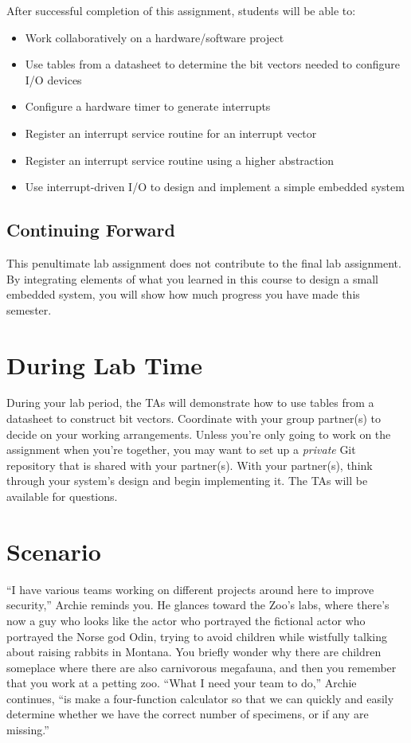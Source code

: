 After successful completion of this assignment, students will be able to:
\begin{itemize}
\item Work collaboratively on a hardware/software project
\item Use tables from a datasheet to determine the bit vectors needed to
    configure I/O devices
\item Configure a hardware timer to generate interrupts
\item Register an interrupt service routine for an interrupt vector
\item Register an interrupt service routine using a higher abstraction
\item Use interrupt-driven I/O to design and implement a simple embedded system
\end{itemize}

\subsection*{Continuing Forward}

This penultimate lab assignment does not contribute to the final lab assignment.
By integrating elements of what you learned in this course to design a small
embedded system, you will show how much progress you have made this semester.

\section*{During Lab Time}

During your lab period, the TAs will demonstrate how to use tables from a datasheet to construct bit vectors.
Coordinate with your group partner(s) to decide on your working arrangements.
Unless you're only going to work on the assignment when you're together, you may want to set up a \textit{private} Git repository that is shared with your partner(s).
With your partner(s), think through your system's design and begin implementing it.
The TAs will be available for questions.

\softwareengineeringfrontmatter

\section{Scenario}

``I have various teams working on different projects around here to improve security,'' Archie reminds you.
He glances toward the Zoo's labs, where there's now a guy who looks like the actor who portrayed the fictional actor who portrayed the Norse god Odin, trying to avoid children while wistfully talking about raising rabbits in Montana.
You briefly wonder why there are children someplace where there are also carnivorous megafauna, and then you remember that you work at a petting zoo.
``What I need your team to do,'' Archie continues, ``is make a four-function calculator so that we can quickly and easily determine whether we have the correct number of specimens, or if any are missing.''

